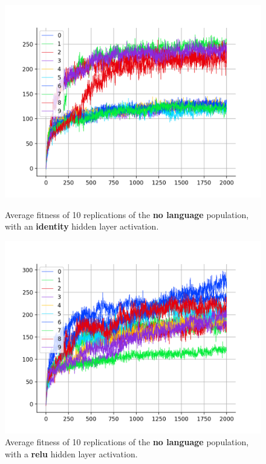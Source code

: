 \documentclass[12pt,a4paper,twoside,openright]{report}
\begin{document}
\begin{figure}[t]
   \centering
   \begin{minipage}{0.49\textwidth}
          \centering
          \captionsetup{width=.9\linewidth}
          \includegraphics[width=1.\linewidth]{results/ten-none-identity.png}
          \caption{Average fitness of 10 replications of the {\bf no language} population, with an {\bf identity} hidden layer activation.}
          \label{fig:ten-none-identity}
   \end{minipage}
   \begin{minipage}{0.49\textwidth}
          \centering
          \captionsetup{width=.9\linewidth}
          \includegraphics[width=1.\linewidth]{results/ten-none-relu.png}
          \caption{Average fitness of 10 replications of the {\bf no language} population, with a {\bf relu} hidden layer activation.}
          \label{fig:ten-none-relu}
   \end{minipage}
\end{figure}
\end{document}
